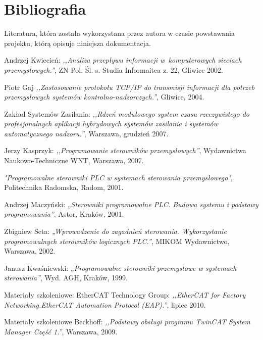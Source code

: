 \section{Bibliografia}
Literatura, która została wykorzystana przez autora w czasie powstawania projektu, którą opisuje niniejsza dokumentacja.

\begin{thebibliography}{99}
Andrzej Kwiecień:
\emph{,,Analiza przepływu informacji w~komputerowych sieciach przemysłowych.''},
ZN Pol. Śl. s. Studia Informaitca z. 22, Gliwice 2002.

Piotr Gaj
\emph{,,Zastosowanie protokołu TCP/IP do transmisji informacji dla potrzeb przemysłowych systemów kontrolno-nadzorczych.''},
Gliwice,
2004.

Zakład Systemów Zasilania:
\emph{,,Rdzeń modułowego system czasu rzeczywistego do profesjonalnych aplikacji hybrydowych systemów zasilania i systemów automatycznego nadzoru.''},
Warszawa,
grudzień 2007. 
 
Jerzy Kasprzyk: 
\emph{,,Programowanie sterowników przemysłowych''},
Wydawnictwa Naukowo-Techniczne WNT, 
Warszawa, 
2007.      

\emph{"Programowalne sterowniki PLC w systemach sterowania przemysłowego"}, 
Politechnika Radomska, 
Radom,
2001.

Andrzej Maczyński:
\emph{„Sterowniki programowalne PLC. Budowa systemu i podstawy programowania”},
Astor, 
Kraków,
2001. 

Zbigniew Seta: 
\emph{„Wprowadzenie do zagadnień sterowania. Wykorzystanie programowalnych sterowników logicznych PLC.”},
MIKOM Wydawnictwo, 
Warszawa,
2002. 

Janusz Kwaśniewski: 
\emph{„Programowalne sterowniki przemysłowe w systemach sterowania”}, 
Wyd. AGH, 
Kraków,
1999.

%
Materiały szkoleniowe: EtherCAT Technology Group:
\emph{,,EtherCAT for Factory Networking.EtherCAT Automation Protocol (EAP).''},
lipiec 2010.

Materiały szkoleniowe Beckhoff:
\emph{,,Podstawy obsługi programu TwinCAT System Manager Część 1.''},
Warszawa,
2009.

%


\end{thebibliography}

